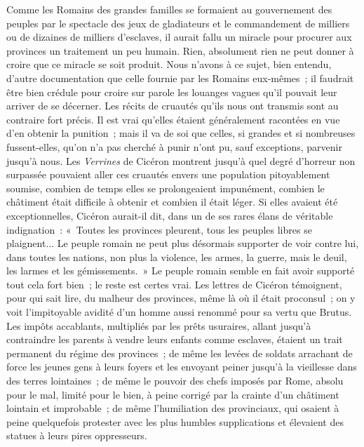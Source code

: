 \documentclass[french,twoside]{book} %
\begin{document}
Comme les Romains des grandes familles se formaient au gouvernement des peuples par le spectacle des jeux de gladiateurs et le commandement de milliers ou de dizaines de milliers d'esclaves, il aurait fallu un miracle pour procurer aux provinces un traitement un peu humain. Rien, absolument rien ne peut donner à croire que ce miracle se soit produit. Nous n'avons à ce sujet, bien entendu, d'autre documentation que celle fournie par les Romains eux-mêmes ; il faudrait être bien crédule pour croire sur parole les louanges vagues qu'il pouvait leur arriver de se décerner. Les récits de cruautés qu'ils nous ont transmis sont au contraire fort précis. Il est vrai qu'elles étaient généralement racontées en vue d'en obtenir la punition ; mais il va de soi que celles, si grandes et si nombreuses fussent-elles, qu'on n'a pas cherché à punir n'ont pu, sauf exceptions, parvenir jusqu'à nous. Les {\itshape Verrines} de Cicéron montrent jusqu'à quel degré d'horreur non surpassée pouvaient aller ces cruau­tés envers une population pitoyablement soumise, combien de temps elles se prolongeaient impunément, combien le châtiment était difficile à obtenir et combien il était léger. Si elles avaient été exceptionnelles, Cicéron aurait-il dit, dans un de ses rares élans de véritable indignation : « Toutes les provinces pleurent, tous les peuples libres se plaignent... Le peuple romain ne peut plus désormais supporter de voir contre lui, dans toutes les nations, non plus la violence, les armes, la guerre, mais le deuil, les larmes et les gémissements. » Le peuple romain semble en fait avoir supporté tout cela fort bien ; le reste est certes vrai. Les lettres de Cicéron témoignent, pour qui sait lire, du malheur des provinces, même là où il était proconsul ; on y voit l'impitoyable avidité d'un homme aussi renommé pour sa vertu que Brutus. Les impôts accablants, multipliés par les prêts usuraires, allant jusqu'à contraindre les parents à vendre leurs enfants comme esclaves, étaient un trait permanent du régime des provinces ; de même les levées de soldats arrachant de force les jeunes gens à leurs foyers et les envoyant peiner jusqu'à la vieillesse dans des terres loin­taines ; de même le pouvoir des chefs imposés par Rome, absolu pour le mal, limité pour le bien, à peine corrigé par la crainte d'un châtiment lointain et improbable ; de même l'humiliation des provinciaux, qui osaient à peine quelquefois protester avec les plus humbles supplications et élevaient des statues à leurs pires oppresseurs.\par
\end{document}
